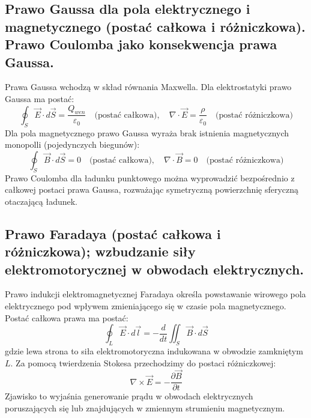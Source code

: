 \documentclass[11pt,a4paper]{article}
\begin{document}
\subsection{Prawo Gaussa dla pola elektrycznego i magnetycznego (postać całkowa i różniczkowa). Prawo Coulomba jako konsekwencja prawa Gaussa.}
Prawa Gaussa wchodzą w skład równania Maxwella. Dla elektrostatyki prawo Gaussa ma postać:
\begin{equation}
\oint_S \vec{E} \cdot d\vec{S} = \frac{Q_{wen}}{\varepsilon_0} \quad \text{(postać całkowa)}, \quad \nabla \cdot \vec{E} = \frac{\rho}{\varepsilon_0} \quad \text{(postać różniczkowa)}
\end{equation}
Dla pola magnetycznego prawo Gaussa wyraża brak istnienia magnetycznych monopolli (pojedynczych biegunów):
\begin{equation}
\oint_S \vec{B} \cdot d\vec{S} = 0 \quad \text{(postać całkowa)}, \quad \nabla \cdot \vec{B} = 0 \quad \text{(postać różniczkowa)}
\end{equation}
Prawo Coulomba dla ładunku punktowego można wyprowadzić bezpośrednio z całkowej postaci prawa Gaussa, rozważając symetryczną powierzchnię sferyczną otaczającą ładunek.

\subsection{Prawo Faradaya (postać całkowa i różniczkowa); wzbudzanie siły elektromotorycznej w obwodach elektrycznych.}
Prawo indukcji elektromagnetycznej Faradaya określa powstawanie wirowego pola elektrycznego pod wpływem zmieniającego się w czasie pola magnetycznego. Postać całkowa prawa ma postać:
\begin{equation}
\oint_L \vec{E} \cdot d\vec{l} = -\frac{d}{dt}\iint_S \vec{B} \cdot d\vec{S}
\end{equation}
gdzie lewa strona to siła elektromotoryczna indukowana w obwodzie zamkniętym $L$. Za pomocą twierdzenia Stokesa przechodzimy do postaci różniczkowej:
\begin{equation}
\nabla \times \vec{E} = -\frac{\partial \vec{B}}{\partial t}
\end{equation}
Zjawisko to wyjaśnia generowanie prądu w obwodach elektrycznych poruszających się lub znajdujących w zmiennym strumieniu magnetycznym.
\end{document}
